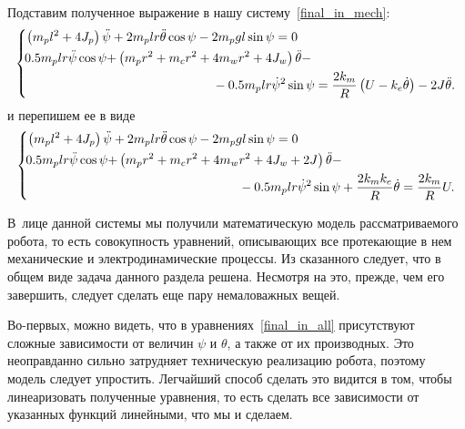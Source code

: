 \documentclass[12pt,a4paper,openany]{extarticle}
\begin{document}
Подставим полученное выражение в нашу систему~\eqref{final_in_mech}:
\begin{equation}
	\left\{  
	\begin{aligned}
		\!&\left(m_pl^2 + 4J_p\right)\ddot\psi + 2m_plr\ddot\theta\cos\psi - 2m_pgl\sin\psi= 0\\
		\!&\begin{split}0.5m_plr\ddot\psi\cos\psi + &\left(m_pr^2 + m_cr^2 + 4m_wr^2 + 4J_w\right)\ddot\theta -\\ 	
			&\phantom{--------}-0.5m_plr\dot\psi^2\sin\psi = \frac{2k_m}{R}\left(U-k_e\dot\theta\right) - 2J\ddot\theta\ldotp
		\end{split}	
	\end{aligned}   
	\right.
\end{equation}
и перепишем ее в виде
\begin{equation}\label{final_in_all}
	\left\{  
	\begin{aligned}
		\!&\left(m_pl^2 + 4J_p\right)\ddot\psi + 2m_plr\ddot\theta\cos\psi - 2m_pgl\sin\psi= 0\\
		\!&\begin{split}0.5m_plr\ddot\psi\cos\psi + &\left(m_pr^2 + m_cr^2 + 4m_wr^2 + 4J_w + 2J\right)\ddot\theta - \\	
			&\phantom{----------}-0.5m_plr\dot\psi^2\sin\psi + \frac{2k_mk_e}{R}\dot\theta = \frac{2k_m}{R}U\ldotp
		\end{split}	
	\end{aligned}   
	\right.
\end{equation}

В~лице данной системы мы получили математическую модель рассматриваемого робота, то есть совокупность уравнений, описывающих все протекающие в нем механические и электродинамические процессы.
Из сказанного следует, что в общем виде задача данного раздела решена.
Несмотря на это, прежде, чем его завершить, следует сделать еще пару немаловажных вещей.

Во-первых, можно видеть, что в уравнениях~\eqref{final_in_all} присутствуют сложные зависимости от величин $\psi$ и $\theta$, а также от их производных.
Это неоправданно сильно затрудняет техническую реализацию робота, поэтому модель следует упростить.
Легчайший способ сделать это видится в том, чтобы линеаризовать полученные уравнения, то есть сделать все зависимости от указанных функций линейными, что мы и сделаем.
\end{document}
